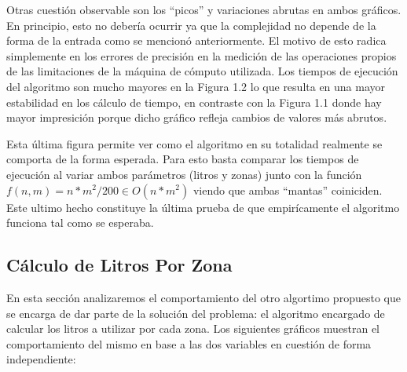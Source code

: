 \documentclass[a4paper,11pt] {article}
\begin{document}
Otras cuesti\'on observable son los ``picos'' y variaciones abrutas en ambos gr\'aficos. En principio, esto no deber\'ia ocurrir ya que la complejidad no depende de la forma de la entrada como se mencion\'o anteriormente. El motivo de esto radica simplemente en los errores de precisi\'on en la medici\'on de las operaciones propios de las limitaciones de la m\'aquina de c\'omputo utilizada. Los tiempos de ejecuci\'on del algoritmo son mucho mayores en la Figura 1.2 lo que resulta en una mayor estabilidad en los c\'alculo de tiempo, en contraste con la Figura 1.1 donde hay mayor impresici\'on porque dicho gr\'afico refleja cambios de valores m\'as abrutos.
% 

Esta \'ultima figura permite ver como el algoritmo en su totalidad realmente se comporta de la forma esperada. 
Para esto basta comparar los tiempos de ejecuci\'on al variar ambos par\'ametros (litros y zonas) junto con la funci\'on $f(n,m) = n*m^2/200 \in O(n*m^2)$ viendo que ambas ``mantas'' coiniciden. Este ultimo hecho constituye la \'ultima prueba de que empir\'icamente el algoritmo funciona tal como se esperaba.

\subsection*{C\'alculo de Litros Por Zona}

En esta secci\'on analizaremos el comportamiento del otro algortimo propuesto que se encarga de dar parte de la soluci\'on del problema: el algoritmo encargado de calcular los litros a utilizar por cada zona. Los siguientes gr\'aficos muestran el comportamiento del mismo en base a las dos variables en cuesti\'on de forma independiente:

\end{document}
